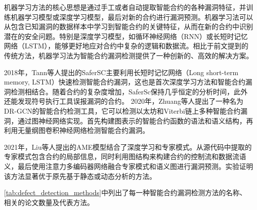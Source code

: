     机器学习方法的核心思想是通过手工或者自动提取智能合约的各种漏洞特征，并训练机器学习模型或深度学习模型，最后对新的合约进行漏洞预测。机器学习法可以从包含已知漏洞的数据样本中学习到智能合约的关键特征，从而在新的合约中识别潜在的安全问题。特别是深度学习模型，如循环神经网络（RNN）或长短时记忆网络（LSTM），能够更好地应对合约中复杂的逻辑和数据流。相比于前文提到的传统方法，机器学习法为智能合约漏洞检测提供了一种创新的、高效的解决方案\cite{cui2024}。

    2018年，Tann等人提出的SaferSC\cite{tann2018towards}主要利用长短时记忆网络（Long short-term memory, LSTM）快速检测智能合约漏洞，这也是首次深度学习方法和智能合约漏洞检测相结合。随着合约的复杂度增加，SaferSc保持几乎恒定的分析时间，此外还能发现符号执行工具误报漏洞的合约。
    2020年，Zhuang等人提出了一种名为DR-GCN\cite{zhuang2021smart}的智能合约检测工具，它可以检测以太坊和Viterbi链上多种智能合约漏洞，通过图神经网络实现。首先构建图表示的智能合约函数的语法和语义结构，再利用无量纲图卷积神经网络检测智能合约漏洞。
    
    2021年，Liu等人提出的AME\cite{liu2021smart}模型结合了深度学习和专家模式。从源代码中提取的专家模式包含合约的局部信息，同时利用图结构来构建合约的控制流和数据流语义，最后使用注意力多编码器网络融合专家模式和语义图进行漏洞预测。实验证明该方法显著优于原先基于静态或动态分析的方法。



\autoref{tab:defect_detection_methods}中列出了每一种智能合约漏洞检测方法的名称、相关的论文数量及代表方法。

